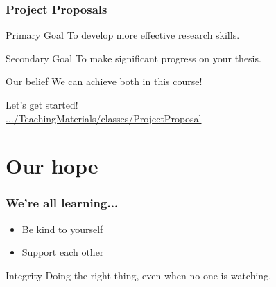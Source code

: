 \documentclass{beamer}
\begin{document}
\begin{frame}
    \frametitle{Project Proposals}

    \begin{block}{Primary Goal}
        To develop more effective research skills.
    \end{block}

    \begin{block}{Secondary Goal}
        To make significant progress on your thesis.
    \end{block}

    \begin{block}{Our belief}
        We can achieve both in this course!
    \end{block}

Let's get started!\\
        \href{https://github.com/analyticalworkflows/TeachingMaterials/tree/master/classes/ProjectProposal}{.../TeachingMaterials/classes/ProjectProposal}


\end{frame}


\section{Our hope}


\begin{frame}
    \frametitle{We're all learning...}


    \begin{itemize}
        \item Be kind to yourself
        \item Support each other
    \end{itemize}

	\bigskip

    \begin{block}{Integrity}
      Doing the right thing, even when no one is watching.
    \end{block}

\end{frame}
\end{document}
